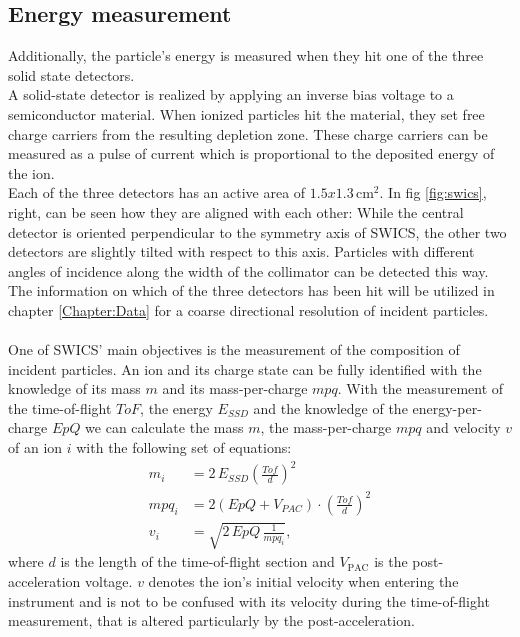 \subsection{Energy measurement}
Additionally, the particle's energy is measured when they hit one of the three solid state detectors. \\
A solid-state detector is realized by applying an inverse bias voltage to a semiconductor material. When ionized particles hit the material, they set free charge carriers from the resulting depletion zone. These charge carriers can be measured as a pulse of current which is proportional to the deposited energy of the ion. \\
Each of the three detectors has an active area of $1.5 x 1.3 \,\mathrm{cm^2}$. In fig \ref{fig:swics}, right,  can be seen how they are aligned with each other: While the central detector is oriented perpendicular to the symmetry axis of SWICS, the other two detectors are slightly tilted with respect to this axis. Particles with different angles of incidence along the width of the collimator can be detected this way. The information on which of the three detectors has been hit will be utilized in chapter \ref{Chapter:Data} for a coarse directional resolution of incident particles.
\\ \\
One of SWICS' main objectives is the measurement of the composition of incident particles. An ion and its charge state can be fully identified with the knowledge of its mass $m$ and its mass-per-charge $mpq$. 
With the measurement of the time-of-flight $ToF$, the energy $E_{SSD}$ and the knowledge of the energy-per-charge $EpQ$ we can calculate the mass $m$, the mass-per-charge $mpq$ and velocity $v$ of an ion $i$ with the following set of equations:
\begin{align}
m_i &= 2\,E_{SSD} \left( \frac{Tof}{d}\right)^2 \label{eq:swics_set1}\\
mpq_i &= 2 \left(EpQ + V_{PAC}\right) \cdot \left(\frac{Tof}{d}\right)^2 \label{eq:swics_set2} \\
v_i &= \sqrt{2\,EpQ\,\frac{1}{mpq_i}},
\label{eq:swics_set3}
\end{align}
where $d$ is the length of the time-of-flight section and $V_{\mathrm{PAC}}$ is the post-acceleration voltage. $v$ denotes the ion's initial velocity when entering the instrument and is not to be confused with its velocity during the time-of-flight measurement, that is altered particularly by the post-acceleration.
%
%
%
